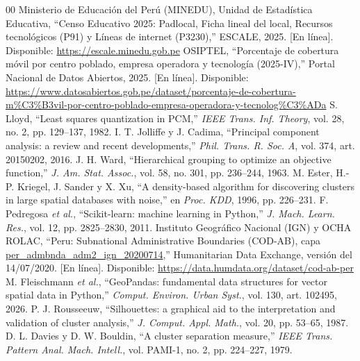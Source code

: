 \documentclass[conference]{IEEEtran}
\begin{document}
\begin{thebibliography}{00}
 Ministerio de Educación del Perú (MINEDU), Unidad de Estadística Educativa, ``Censo Educativo 2025: Padlocal, Ficha lineal del local, Recursos tecnológicos (P91) y Líneas de internet (P3230),'' ESCALE, 2025. [En línea]. Disponible: \url{https://escale.minedu.gob.pe}
 OSIPTEL, ``Porcentaje de cobertura móvil por centro poblado, empresa operadora y tecnología (2025-IV),'' Portal Nacional de Datos Abiertos, 2025. [En línea]. Disponible: \url{https://www.datosabiertos.gob.pe/dataset/porcentaje-de-cobertura-m%C3%B3vil-por-centro-poblado-empresa-operadora-y-tecnolog%C3%ADa}
 S. Lloyd, ``Least squares quantization in PCM,'' \emph{IEEE Trans. Inf. Theory}, vol. 28, no. 2, pp. 129--137, 1982.
 I. T. Jolliffe y J. Cadima, ``Principal component analysis: a review and recent developments,'' \emph{Phil. Trans. R. Soc. A}, vol. 374, art. 20150202, 2016.
 J. H. Ward, ``Hierarchical grouping to optimize an objective function,'' \emph{J. Am. Stat. Assoc.}, vol. 58, no. 301, pp. 236--244, 1963.
 M. Ester, H.-P. Kriegel, J. Sander y X. Xu, ``A density-based algorithm for discovering clusters in large spatial databases with noise,'' en \emph{Proc. KDD}, 1996, pp. 226--231.
 F. Pedregosa \emph{et al.}, ``Scikit-learn: machine learning in Python,'' \emph{J. Mach. Learn. Res.}, vol. 12, pp. 2825--2830, 2011.
 Instituto Geográfico Nacional (IGN) y OCHA ROLAC, ``Peru: Subnational Administrative Boundaries (COD-AB), capa \url{per_admbnda_adm2_ign_20200714},'' Humanitarian Data Exchange, versión del 14/07/2020. [En línea]. Disponible: \url{https://data.humdata.org/dataset/cod-ab-per}
 M. Fleischmann \emph{et al.}, ``GeoPandas: fundamental data structures for vector spatial data in Python,'' \emph{Comput. Environ. Urban Syst.}, vol. 130, art. 102495, 2026.
 P. J. Rousseeuw, ``Silhouettes: a graphical aid to the interpretation and validation of cluster analysis,'' \emph{J. Comput. Appl. Math.}, vol. 20, pp. 53--65, 1987.
 D. L. Davies y D. W. Bouldin, ``A cluster separation measure,'' \emph{IEEE Trans. Pattern Anal. Mach. Intell.}, vol. PAMI-1, no. 2, pp. 224--227, 1979.
\end{thebibliography}
\end{document}
